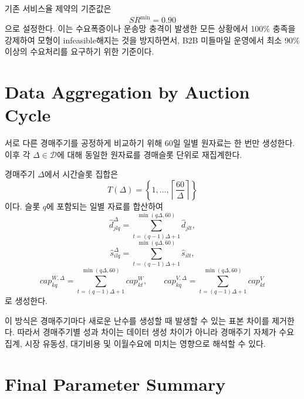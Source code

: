 \documentclass[11pt,a4paper]{article}
\begin{document}
기존 서비스율 제약의 기준값은
\[
SR^{\min}=0.90
\]
으로 설정한다. 이는 수요폭증이나 운송망 충격이 발생한 모든 상황에서 100\% 충족을 강제하여 모형이 infeasible해지는 것을 방지하면서, B2B 미들마일 운영에서 최소 90\% 이상의 수요처리를 요구하기 위한 기준이다.

\section{Data Aggregation by Auction Cycle}
서로 다른 경매주기를 공정하게 비교하기 위해 60일 일별 원자료는 한 번만 생성한다. 이후 각 $\Delta\in\mathcal D$에 대해 동일한 원자료를 경매슬롯 단위로 재집계한다.

경매주기 $\Delta$에서 시간슬롯 집합은
\[
T(\Delta)
=\left\{1,\ldots,
\left\lceil\frac{60}{\Delta}\right\rceil
\right\}
\]
이다. 슬롯 $q$에 포함되는 일별 자료를 합산하여
\[
\hat d^{\Delta}_{jlq}
=
\sum_{t=(q-1)\Delta+1}^{\min(q\Delta,60)}
\hat d_{jlt},
\]
\[
\hat s^{\Delta}_{ilq}
=
\sum_{t=(q-1)\Delta+1}^{\min(q\Delta,60)}
\hat s_{ilt},
\]
\[
cap^{W,\Delta}_{kq}
=
\sum_{t=(q-1)\Delta+1}^{\min(q\Delta,60)}
cap^{W}_{kt},
\qquad
cap^{V,\Delta}_{kq}
=
\sum_{t=(q-1)\Delta+1}^{\min(q\Delta,60)}
cap^{V}_{kt}
\]
로 생성한다.

이 방식은 경매주기마다 새로운 난수를 생성할 때 발생할 수 있는 표본 차이를 제거한다. 따라서 경매주기별 성과 차이는 데이터 생성 차이가 아니라 경매주기 자체가 수요집계, 시장 유동성, 대기비용 및 이월수요에 미치는 영향으로 해석할 수 있다.

\section{Final Parameter Summary}
\end{document}
